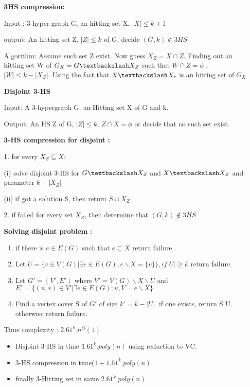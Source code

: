 \documentclass{homeworg}
\begin{document}
\textbf{3HS compression:}

Input : 3-hyper graph G, an hitting set X, $|X|\leq k+1$

output: An hitting set Z, $|Z|\leq k$ of G, decide $(G,k) \notin 3HS$

Algorithm:
Assume such set Z exist. Now guess $X_Z = X \cap Z$. Finding out an hitting set W of $G_X = G \textbackslash X_Z$ such that $W \cap Z= \phi$ , $|W| \leq k-|X_Z|$. Using the fact that $X \textbackslash X_z$ is an hitting set of $G_X$
 
 \textbf{Disjoint 3-HS}
 
 Input: A 3-hypergraph G, an Hitting set X of G and k.
 
 Output: An HS Z of G, $|Z| \leq k$, $Z\cap X= \phi $ or decide that no such set exist.
 
 \textbf{3-HS compression for disjoint :}
 
 1. for every $X_Z \subseteq X$:
 
 \quad (i) solve disjoint 3-HS for $G \textbackslash X_Z$ and $X \textbackslash X_Z$ and parameter $k-|X_Z|$
 
 \quad (ii) if got a solution S, then return $S \cup X_Z$
 
 2. if failed for every set $X_Z$, then determine that $(G,k) \notin 3HS$
 
 \textbf{Solving disjoint problem :}
 
 \begin{enumerate}
     \item if there is $e \in E(G)$ such that $e \subseteq X$ return failure
     \item Let $U=\{v\in V(G) | \exists e\in E(G), e\backslash X=\{v\}\}, if |U|\geq k$ return failure.
     \item Let $ G'= (V', E')$ where $V'=V(G)\backslash X\backslash U $ and $E'=\{ (u,v) \in V' | \exists e \in E(G); {u,V}=e \backslash X \}$ 
     \item Find a vertex cover S of $G'$ of size $ k' = k - |U|$. if one exists, return S \cup U. otherwise return failure.

 \end{enumerate}
Time complexity : $2.61^k .n^O(1)$ 
 \begin{itemize}
     \item Disjoint 3-HS in time $1.61^k .poly(n)$ using reduction to VC.
     \item 3-HS compression in time($1+1.61^k.poly(n)$
     \item finally 3-Hitting set in same $2.61^k .poly(n)$  
 \end{itemize}
     
\end{document}
